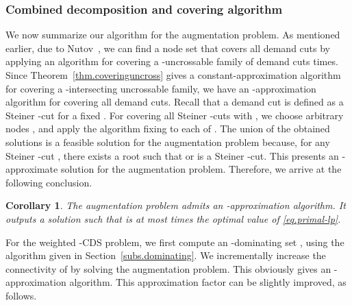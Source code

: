 \documentclass[11pt]{article}
\newtheorem{corollary}{Corollary}
\begin{document}
  \subsubsection{Combined decomposition and covering algorithm}
  \label{ssec.combine}
  
  We now summarize our algorithm for the augmentation problem.
  As mentioned earlier, 
  due to Nutov~\cite{Nutov12},
  we can find a node set that covers all demand cuts
  by applying an
  algorithm for covering a -uncrossable family of demand cuts 
  times.
Since Theorem~\ref{thm.coveringuncross} gives a constant-approximation algorithm
  for covering a -intersecting uncrossable family,
  we have an -approximation algorithm for covering all demand
  cuts.
  Recall that a demand cut is defined as a Steiner -cut for a
  fixed .
  For covering all Steiner -cuts  with ,
  we choose arbitrary  nodes ,
  and apply the algorithm fixing  to each of .
  The union of the obtained solutions is
  a feasible solution for the augmentation problem
  because, for any Steiner -cut ,
  there exists a root  such that  or  is a
  Steiner -cut.
  This presents 
  an -approximate
  solution for the augmentation problem.
  Therefore, we arrive at the following conclusion.

   \begin{corollary}
    \label{cor.augmentation}
    The augmentation problem admits 
    an -approximation algorithm.
    It outputs a solution  such that 
   is at most  times the optimal value of \eqref{eq.primal-lp}.
   \end{corollary}
  

  
 For the weighted -CDS problem,
 we first compute an -dominating set , using the algorithm given in
 Section~\ref{subs.dominating}.
 We incrementally increase the connectivity of  
 by solving the augmentation problem.
 This obviously gives an -approximation algorithm.
 This approximation factor can be slightly improved, as follows.
\end{document}
